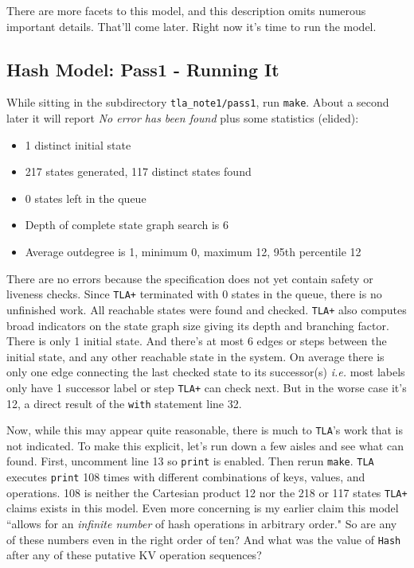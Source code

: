 \documentclass[twocolumn]{article}
\begin{document}
There are more facets to this model, and this description omits numerous important details. That'll come later. Right now it's time to run the model.

\subsection{Hash Model: Pass1 - Running It}

While sitting in the subdirectory \texttt{tla\_note1/pass1}, run \texttt{make}. About a second later it will report \emph{No error has been found} plus some statistics (elided):

\begin{itemize}
\item 1 distinct initial state
\item 217 states generated, 117 distinct states found
\item 0 states left in the queue
\item Depth of complete state graph search is 6
\item Average outdegree is 1, minimum 0, maximum 12, 95th percentile 12
\end{itemize}

There are no errors because the specification does not yet contain safety or liveness checks. Since \texttt{TLA+} terminated with 0 states in the queue, there is no unfinished work. All reachable states were found and checked. \texttt{TLA+} also computes broad indicators on the state graph size giving its depth and branching factor. There is only 1 initial state. And there's at most 6 edges or steps between the initial state, and any other reachable state in the system. On average there is only one edge connecting the last checked state to its successor(s) \emph{i.e.} most labels only have 1 successor label or step \texttt{TLA+} can check next. But in the worse case it's 12, a direct result of the \texttt{with} statement line 32.

Now, while this may appear quite reasonable, there is much to \texttt{TLA}'s work that is not indicated. To make this explicit, let's run down a few aisles and see what can found. First, uncomment line 13 so \texttt{print} is enabled. Then rerun \texttt{make}. \texttt{TLA} executes \texttt{print} 108 times with different combinations of keys, values, and operations. 108 is neither the Cartesian product 12 nor the 218 or 117 states \texttt{TLA+} claims exists in this model. Even more concerning is my earlier claim this model ``allows for an \emph{infinite number} of hash operations in arbitrary order." So are any of these numbers even in the right order of ten? And what was the value of \texttt{Hash} after any of these putative KV operation sequences?
\end{document}
